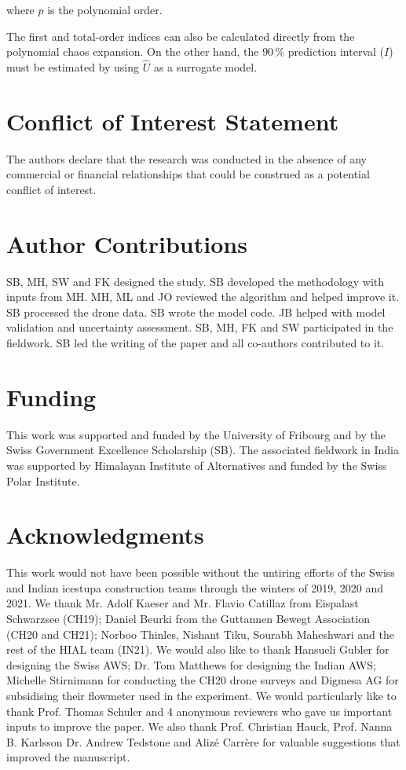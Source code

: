 \documentclass[utf8]{frontiersSCNS}
\begin{document}
where $p$ is the polynomial order. 

The first and total-order indices can also be calculated directly from the polynomial chaos expansion. On the
other hand, the $90\, \%$ prediction interval ($I$) must be estimated by using $\hat{U}$ as a surrogate
model.

\section*{Conflict of Interest Statement} The authors declare that the research was conducted in the absence of
any commercial or financial relationships that could be construed as a potential conflict of interest.

\section*{Author Contributions} SB, MH, SW and FK designed the study.  SB developed the methodology with inputs
from MH.  MH, ML and JO reviewed the algorithm and helped improve it. SB processed the drone data. SB wrote the
model code. JB helped with model validation and uncertainty assessment. SB, MH, FK and SW participated in the
fieldwork.  SB led the writing of the paper and all co-authors contributed to it.

\section*{Funding} This work was supported and funded by the University of Fribourg and by the Swiss Government
Excellence Scholarship (SB). The associated fieldwork in India was supported by Himalayan Institute of
Alternatives and funded by the Swiss Polar Institute.

\section*{Acknowledgments} This work would not have been possible without the untiring efforts of the Swiss and
Indian icestupa construction teams through the winters of 2019, 2020 and 2021. We thank Mr. Adolf Kaeser and Mr.
Flavio Catillaz from Eispalast Schwarzsee (CH19); Daniel Beurki from the Guttannen Bewegt Association (CH20 and
CH21); Norboo Thinles, Nishant Tiku, Sourabh Maheshwari and the rest of the HIAL team (IN21).  We would also
like to thank Hansueli Gubler for designing the Swiss AWS; Dr. Tom Matthews for designing the Indian AWS;
Michelle Stirnimann for conducting the CH20 drone surveys and Digmesa AG for subsidising their flowmeter used in
the experiment.  We would particularly like to thank Prof. Thomas Schuler and 4 anonymous reviewers who gave us
important inputs to improve the paper. We also thank Prof. Christian Hauck, Prof. Nanna B. Karlsson Dr. Andrew
Tedstone and Alizé Carrère for valuable suggestions that improved the manuscript.
\end{document}
